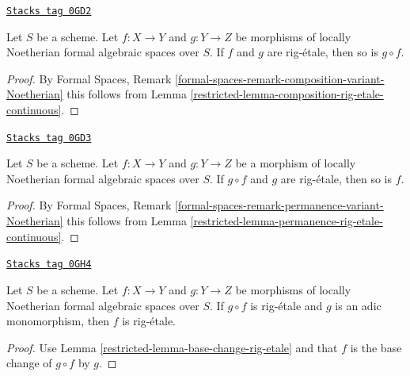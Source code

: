 \begin{lemma}
\label{restricted-lemma-composition-rig-etale}
\href{https://stacks.math.columbia.edu/tag/0GD2}{\texttt{Stacks tag 0GD2}}

Let $S$ be a scheme. Let $f : X \to Y$ and $g : Y \to Z$
be morphisms of locally Noetherian formal algebraic spaces over $S$.
If $f$ and $g$ are rig-\'etale, then so is $g \circ f$.
\end{lemma}

\begin{proof}

By Formal Spaces, Remark
\ref{formal-spaces-remark-composition-variant-Noetherian}
this follows from Lemma \ref{restricted-lemma-composition-rig-etale-continuous}.
\end{proof}

\begin{lemma}
\label{restricted-lemma-rig-etale-permanence}
\href{https://stacks.math.columbia.edu/tag/0GD3}{\texttt{Stacks tag 0GD3}}

Let $S$ be a scheme. Let $f : X \to Y$ and $g : Y \to Z$
be a morphism of locally Noetherian formal algebraic spaces over $S$.
If $g \circ f$ and $g$ are rig-\'etale, then so is $f$.
\end{lemma}

\begin{proof}

By Formal Spaces, Remark
\ref{formal-spaces-remark-permanence-variant-Noetherian}
this follows from Lemma \ref{restricted-lemma-permanence-rig-etale-continuous}.
\end{proof}

\begin{lemma}
\label{restricted-lemma-rig-etale-alternative-permanence}
\href{https://stacks.math.columbia.edu/tag/0GH4}{\texttt{Stacks tag 0GH4}}

Let $S$ be a scheme. Let $f : X \to Y$ and $g : Y \to Z$
be morphisms of locally Noetherian formal algebraic spaces over $S$.
If $g \circ f$ is rig-\'etale and $g$ is an adic monomorphism, then
$f$ is rig-\'etale.
\end{lemma}

\begin{proof}

Use Lemma \ref{restricted-lemma-base-change-rig-etale} and that
$f$ is the base change of $g \circ f$ by $g$.
\end{proof}


